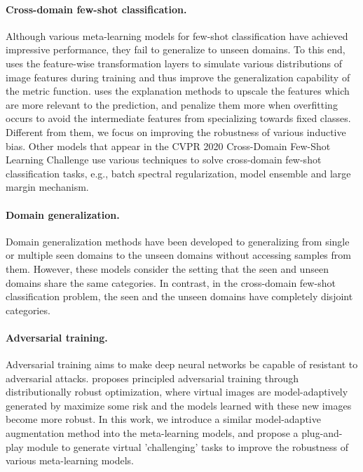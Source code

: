 \documentclass{article}
\begin{document}
\paragraph{Cross-domain few-shot classification.} Although various meta-learning models for few-shot classification have achieved impressive performance, they fail to generalize to unseen domains. To this end, \cite{DBLP:conf/iclr/TsengLH020} uses the feature-wise transformation layers to simulate various distributions of image features during training and thus improve the generalization capability of the metric function. \cite{sun2020explanation} uses the explanation methods to upscale the features which are more relevant to the prediction, and penalize them more when overfitting occurs to avoid the intermediate features from specializing towards fixed classes. Different from them, we focus on improving the robustness of various inductive bias. Other models \cite{liu2020feature,yeh2020large} that appear in the CVPR 2020 Cross-Domain Few-Shot Learning Challenge use various techniques to solve cross-domain few-shot classification tasks, e.g., batch spectral regularization, model ensemble and large margin mechanism.

\paragraph{Domain generalization.} Domain generalization methods \cite{volpi2018generalizing,DBLP:conf/icml/LiYZH19} have been developed to generalizing from single or multiple seen domains to the unseen domains without accessing samples from them. However, these models consider the setting that the seen and unseen domains share the same categories. In contrast, in the cross-domain few-shot classification problem, the seen and the unseen domains have completely disjoint categories.

\paragraph{Adversarial training.} Adversarial training \cite{DBLP:journals/corr/GoodfellowSS14} aims to make deep neural networks be capable of resistant to adversarial attacks. \cite{DBLP:conf/iclr/SinhaND18} proposes principled adversarial training through distributionally robust optimization, where virtual images are model-adaptively generated by maximize some risk and the models learned with these new images become more robust. In this work, we introduce a similar model-adaptive augmentation method into the meta-learning models, and propose a plug-and-play module to generate virtual 'challenging' tasks to improve the robustness of various meta-learning models.
\end{document}
